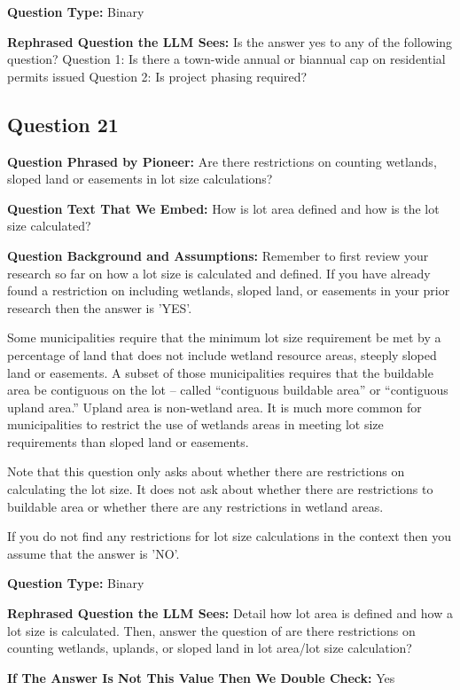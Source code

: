 \noindent\textbf{Question Type:} Binary

\noindent\textbf{Rephrased Question the LLM Sees:} Is the answer yes to any of the following question?
Question 1: Is there a town-wide annual or biannual cap on residential permits issued
Question 2: Is project phasing required?

\vspace{1cm}
\subsection*{Question 21}
\noindent\textbf{Question Phrased by Pioneer:} Are there restrictions on counting wetlands, sloped land or easements in lot size calculations?

\noindent\textbf{Question Text That We Embed:} How is lot area defined and how is the lot size calculated?

\noindent\textbf{Question Background and Assumptions:} Remember to first review your research so far on how a lot size is calculated and defined. If you have already found a restriction on including wetlands, sloped land, or easements in your prior research then the answer is 'YES'.

Some municipalities require that the minimum lot size requirement be met by a percentage of land that does not include wetland resource areas, steeply sloped land or easements. A subset of those municipalities requires that the buildable area be contiguous on the lot – called “contiguous buildable area” or “contiguous upland area.” Upland area is non-wetland area. It is much more common for municipalities to restrict the use of wetlands areas in meeting lot size requirements than sloped land or easements.

Note that this question only asks about whether there are restrictions on calculating the lot size. It does not ask about whether there are restrictions to buildable area or whether there are any restrictions in wetland areas. 

If you do not find any restrictions for lot size calculations in the context then you assume that the answer is 'NO'.

\noindent\textbf{Question Type:} Binary

\noindent\textbf{Rephrased Question the LLM Sees:} Detail how lot area is defined and how a lot size is calculated. Then, answer the question of are there restrictions on counting wetlands, uplands, or sloped land in lot area/lot size calculation?

\noindent\textbf{If The Answer Is Not This Value Then We Double Check:} Yes

